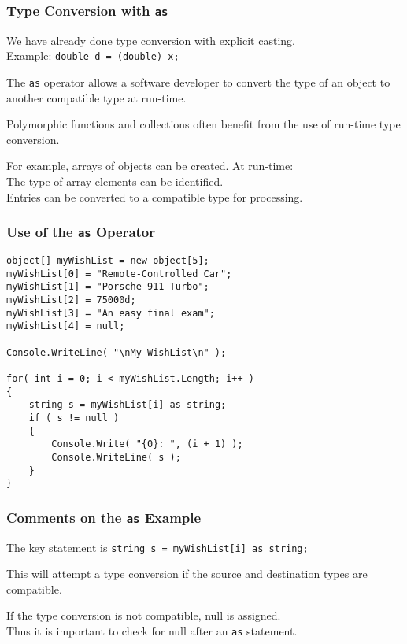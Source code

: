 \begin{frame}
\frametitle{Type Conversion with \texttt{as}}

We have already done type conversion with explicit casting.\\
\quad Example: \texttt{double d = (double) x;}

The \texttt{as} operator allows a software developer to convert the type of an object to another compatible type at run-time.

Polymorphic functions and collections often benefit from the use of run-time type conversion.

For example, arrays of objects can be created. At run-time:\\
    \quad The type of array elements can be identified.\\
    \quad Entries can be converted to a compatible type for processing.

\end{frame}


\begin{frame}[fragile]
\frametitle{Use of the \texttt{as} Operator}

{\small
\begin{verbatim}
object[] myWishList = new object[5];
myWishList[0] = "Remote-Controlled Car";
myWishList[1] = "Porsche 911 Turbo";
myWishList[2] = 75000d;
myWishList[3] = "An easy final exam";
myWishList[4] = null;

Console.WriteLine( "\nMy WishList\n" );

for( int i = 0; i < myWishList.Length; i++ )
{
    string s = myWishList[i] as string;    
    if ( s != null )
    {
        Console.Write( "{0}: ", (i + 1) );
        Console.WriteLine( s );
    }
}
\end{verbatim}
}

\end{frame}

\begin{frame}
\frametitle{Comments on the \texttt{as} Example}
The key statement is \texttt{string s = myWishList[i] as string;}

This will attempt a type conversion if the source and destination types are compatible.

If the type conversion is not compatible, null is assigned.\\
\quad Thus it is important to check for null after an \texttt{as} statement.

\end{frame}



